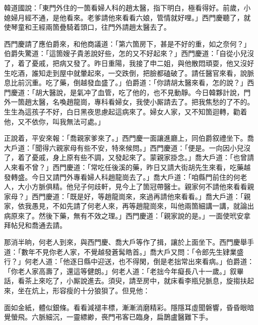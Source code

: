 韓道國說：「東門外住的一箇看婦人科的趙太醫，指下明白，極看得好。前歲，小媳婦月經不通，{}是他看來。老爹請他來看看六娘，管情就好哩。」西門慶聽了，就使琴童和王經兩箇疊騎着頭口，往門外請趙太醫去了。

西門慶請了應伯爵來，和他商議道：「第六箇房下，甚是不好的重，如之奈何？」伯爵失驚道：「這箇嫂子貴恙說好些，怎的又不好起來？」西門慶道：「自從小兒沒了，着了憂戚，把病又發了。昨日重陽，我接了申二姐，與他散悶頑耍，他又沒好生吃酒，誰知走到屋中就暈起來，一交跌倒，把臉都磕破了。請任醫官來看，說脈息比前沉重。吃了藥，倒越發血盛了。」伯爵道：「你請胡太醫來看，怎的說？」西門慶道：「胡大醫說，是氣冲了血管，吃了他的，也不見動靜。今日韓夥計說，門外一箇趙太醫，名喚趙龍崗，專科看婦女，我使小厮請去了。把我焦愁的了不的。生生為這孩子不好，白日黑夜思慮起這病來了。婦女人家，又不知箇迴轉，勸着他，又不依你，叫我無法可處。」{}

正說着，平安來報：「喬親家爹來了。」西門慶一面讓進廳上，同伯爵叙禮坐下。喬大戶道：「聞得六親家母有些不安，特來候問。」西門慶道：「便是。一向因小兒沒了，着了憂戚，身上原有些不調，又發起來了。蒙親家掛念。」喬大戶道：「也曾請人來看不曾？」西門慶道：「常吃任後溪的藥，昨日又請大街胡先生來看，吃藥越發轉盛。今日又請門外專看婦人科趙龍崗去了。」喬大戶道：「咱縣門前住的何老人，大小方脈俱精。他兒子何歧軒，見今上了箇冠帶醫士。親家何不請他來看看親家母？」西門慶道：「既是好，等趙龍崗來，來過再請他來看看。」喬大戶道：「親家，依我愚見，不如先請了何老人來，再等趙龍崗來，叫他兩箇細講一講，就論出病原來了。{}然後下藥，無有不效之理。」西門慶道：「親家說的是。」一面使玳安拿拜帖兒和喬通去請。

那消半晌，何老人到來，與西門慶、喬大戶等作了揖，讓於上面坐下。西門慶舉手道：「數年不見你老人家，不覺越發蒼髯皓首。」喬大戶又問：「令郎先生肄業盛行？」何老人道：「他逐日縣中迎送，也不得閑，倒是老拙常出來看病。」伯爵道：「你老人家高壽了，還這等健朗。」何老人道：「老拙今年癡長八十一歲。」叙畢話，看茶上來吃了，小厮說進去。須臾，請至房中，就床看李瓶兒脈息，旋搊扶起來，坐在炕上，形容瘦的十分狼狽了。但見他：

\begin{myquote}
面如金紙，體似銀條。看看減褪丰標，漸漸消磨精彩。隱隱耳虛聞磐響，昏昏眼暗覺螢飛。六脈細沉，一靈縹緲，䘮門弔客已臨身，扁鵲盧醫難下手。
\end{myquote}

